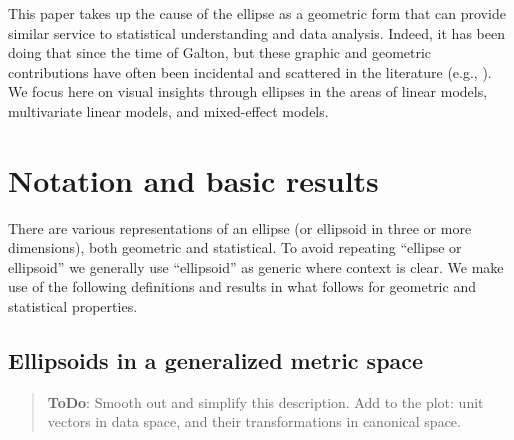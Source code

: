 \documentclass[11pt]{article}%
\newcommand*{\todo}[1]{\marginpar{ToDo:\small{#1}}}
\newcommand{\TODO}[1]{\begin{quotation}\color{blue}\textbf{ToDo}: #1\end{quotation}}
\newcommand*{\mat}[1]{\ensuremath{\bm{#1}}}
\begin{document}
This paper  takes up  the cause  of the  ellipse as  a geometric  form that  can
provide similar service to statistical understanding and data analysis.  Indeed,
it has been doing that since the time of Galton, but these graphic and geometric
contributions have often  been incidental and  scattered in the  literature
(e.g., \citet{Bryant:1984,CampbellAtchley:81,SavilleWood:1986,Wickens:1995}). 
We
focus here on visual  insights through ellipses in  the areas of linear  models,
multivariate linear models, and mixed-effect models.

\section{Notation and basic results}

There are various representations of an ellipse (or ellipsoid in three or more dimensions),
both geometric and statistical.
To avoid repeating ``ellipse or ellipsoid'' we generally use ``ellipsoid'' as generic where context is clear.
We make use of the following definitions and results in what follows for geometric and
statistical properties.





\subsection{Ellipsoids in a generalized metric space}

\TODO{
Smooth out and simplify this description.
Add to the plot: unit vectors in data space, and their transformations in canonical space.
}
\end{document}
